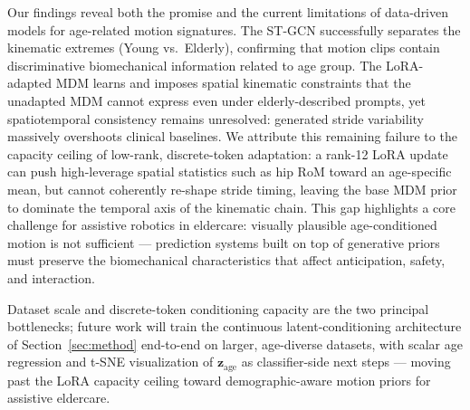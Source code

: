 Our findings reveal both the promise and the current limitations of data-driven models for age-related motion signatures.
The ST-GCN successfully separates the kinematic extremes (Young vs.\ Elderly), confirming that motion clips contain discriminative biomechanical information related to age group.
The LoRA-adapted MDM learns and imposes spatial kinematic constraints that the unadapted MDM cannot express even under elderly-described prompts, yet spatiotemporal consistency remains unresolved: generated stride variability massively overshoots clinical baselines.
We attribute this remaining failure to the capacity ceiling of low-rank, discrete-token adaptation: a rank-12 LoRA update can push high-leverage spatial statistics such as hip RoM toward an age-specific mean, but cannot coherently re-shape stride timing, leaving the base MDM prior to dominate the temporal axis of the kinematic chain.
This gap highlights a core challenge for assistive robotics in eldercare: visually plausible age-conditioned motion is not sufficient --- prediction systems built on top of generative priors must preserve the biomechanical characteristics that affect anticipation, safety, and interaction.

Dataset scale and discrete-token conditioning capacity are the two principal bottlenecks; future work will train the continuous latent-conditioning architecture of Section~\ref{sec:method} end-to-end on larger, age-diverse datasets, with scalar age regression and t-SNE visualization of $\mathbf{z}_\text{age}$ as classifier-side next steps --- moving past the LoRA capacity ceiling toward demographic-aware motion priors for assistive eldercare.